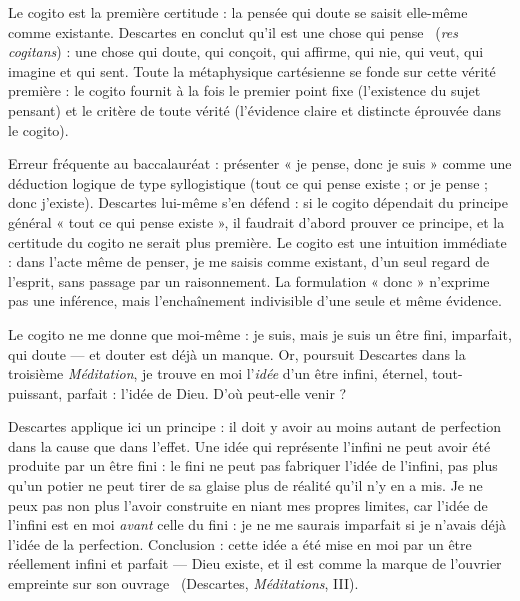 \documentclass[11pt]{article}
\newcommand{\cle}[1]{{\popxbold\color{popdark}#1}}
\newcounter{popsec}
\newcounter{popsub}
\newcommand{\courssub}[1]{%
  \stepcounter{popsub}%
  \par\vspace{9pt}\noindent{\popxbold\fontsize{11.5}{13}\selectfont\color{popink}{\color{poporange}\thepopsec.\thepopsub}\hspace{6pt}#1}\par\nopagebreak\vspace{4pt}
}
\begin{document}
\begin{propriete}
Le \cle{cogito} est la première certitude : la pensée qui doute se saisit elle-même comme existante. Descartes en conclut qu'il est \guillemotleft une chose qui pense \guillemotright\ (\emph{res cogitans}) : une chose qui doute, qui conçoit, qui affirme, qui nie, qui veut, qui imagine et qui sent. Toute la métaphysique cartésienne se fonde sur cette vérité première : le cogito fournit à la fois le premier point fixe (l'existence du sujet pensant) et le critère de toute vérité (l'évidence claire et distincte éprouvée dans le cogito).
\end{propriete}

\begin{attention}
Erreur fréquente au baccalauréat : présenter « je pense, donc je suis » comme une déduction logique de type syllogistique (tout ce qui pense existe ; or je pense ; donc j'existe). Descartes lui-même s'en défend : si le cogito dépendait du principe général « tout ce qui pense existe », il faudrait d'abord prouver ce principe, et la certitude du cogito ne serait plus première. Le cogito est une \cle{intuition} immédiate : dans l'acte même de penser, je me saisis comme existant, d'un seul regard de l'esprit, sans passage par un raisonnement. La formulation « donc » n'exprime pas une inférence, mais l'enchaînement indivisible d'une seule et même évidence.
\end{attention}

\courssub{Du cogito à Dieu : la marque de l'ouvrier}

Le cogito ne me donne que moi-même : je suis, mais je suis un être fini, imparfait, qui doute — et douter est déjà un manque. Or, poursuit Descartes dans la troisième \emph{Méditation}, je trouve en moi l'\emph{idée} d'un être infini, éternel, tout-puissant, parfait : l'idée de Dieu. D'où peut-elle venir ?

Descartes applique ici un principe : il doit y avoir au moins autant de perfection dans la cause que dans l'effet. Une idée qui représente l'infini ne peut avoir été produite par un être fini : le fini ne peut pas fabriquer l'idée de l'infini, pas plus qu'un potier ne peut tirer de sa glaise plus de réalité qu'il n'y en a mis. Je ne peux pas non plus l'avoir construite en niant mes propres limites, car l'idée de l'infini est en moi \emph{avant} celle du fini : je ne me saurais imparfait si je n'avais déjà l'idée de la perfection. Conclusion : cette idée a été mise en moi par un être réellement infini et parfait — Dieu existe, et il est comme la \guillemotleft marque de l'ouvrier empreinte sur son ouvrage \guillemotright\ (Descartes, \emph{Méditations}, III).
\end{document}
